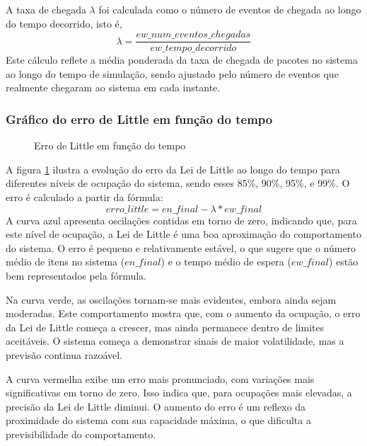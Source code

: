 A taxa de chegada $\lambda$ foi calculada como o número de eventos de chegada ao longo do tempo decorrido, isto é,
$$
\lambda=\frac{ew\_num\_eventos\_chegadas}{ew\_tempo\_decorrido}
$$
Este cálculo reflete a média ponderada da taxa de chegada de pacotes no sistema ao longo do tempo de simulação, sendo ajustado pelo número de eventos que realmente chegaram ao sistema em cada instante.
\subsubsection{Gráfico do erro de Little em função do tempo}
\begin{figure}[h!]
   \centering
   
   \caption{Erro de Little em função do tempo}
   \label{fig:littleE1}
\end{figure}

A figura \ref{fig:littleE1} ilustra a evolução do erro da Lei de Little ao longo do tempo para diferentes níveis de ocupação do sistema, sendo esses 85\%, 90\%, 95\%, e 99\%. O erro é calculado a partir da fórmula:
$$
erro\_little=en\_final − \lambda * ew\_final
$$
A curva azul apresenta oscilações contidas em torno de zero, indicando que, para este nível de ocupação, a Lei de Little é uma boa aproximação do comportamento do sistema. O erro é pequeno e relativamente estável, o que sugere que o número médio de itens no sistema (\(en\_final\)) e o tempo médio de espera (\(ew\_final\)) estão bem representados pela fórmula.

Na curva verde, as oscilações tornam-se mais evidentes, embora ainda sejam moderadas. Este comportamento mostra que, com o aumento da ocupação, o erro da Lei de Little começa a crescer, mas ainda permanece dentro de limites aceitáveis. O sistema começa a demonstrar sinais de maior volatilidade, mas a previsão continua razoável.

A curva vermelha exibe um erro mais pronunciado, com variações mais significativas em torno de zero. Isso indica que, para ocupações mais elevadas, a precisão da Lei de Little diminui. O aumento do erro é um reflexo da proximidade do sistema com sua capacidade máxima, o que dificulta a previsibilidade do comportamento.

